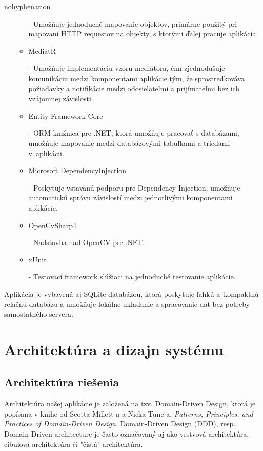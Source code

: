 \begin{hyphenrules}{nohyphenation}
\begin{itemize}
\begin{itemize}
        - Umožňuje jednoduché mapovanie objektov, primárne použitý pri mapovaní HTTP requestov na objekty, s ktorými ďalej pracuje aplikácia.
        \item MediatR \cite{mediatr}

        - Umožňuje implementáciu vzoru mediátora, čím zjednodušuje komunikáciu medzi komponentami aplikácie tým, že sprostredkováva požiadavky a notifikácie medzi odosielateľmi a prijímateľmi bez ich vzájomnej závislosti.

        \item Entity Framework Core \cite{efcore}

        - ORM knižnica pre .NET, ktorá umožňuje pracovať s databázami, umožňuje mapovanie medzi databázovými tabuľkami a triedami v~aplikácii.

        \item Microsoft DependencyInjection \cite{dependency-injection}

        - Poskytuje vstavanú podporu pre Dependency Injection, umožňuje automatickú správu závislostí medzi jednotlivými komponentami aplikácie.

        \item OpenCvSharp4 \cite{opencv}

        - Nadstavba nad OpenCV pre .NET.

        \item xUnit \cite{xunit}

        - Testovací framework slúžiaci na jednoduché testovanie aplikácie.
        
    \end{itemize}
\end{itemize}

Aplikácia je vybavená aj SQLite\cite{sqlite} databázou, ktorá poskytuje ľahkú a~kompaktnú relačnú databázu a umožňuje lokálne ukladanie a spracovanie dát bez potreby samostatného servera.

\section{Architektúra a dizajn systému}
\subsection{Architektúra riešenia}
Architektúra našej aplikácie je založená na tzv. Domain-Driven Design, ktorá je popísana v knihe od Scotta Millett-a a Nicka Tune-a, \textit{Patterns, Principles, and Practices of Domain-Driven Design}\cite{millett2015ddd}. Domain-Driven Design (DDD), resp. Domain-Driven architecture je často označovaný aj ako vrstvová architektúra, cibuľová architektúra či "čistá" architektúra. 
\newline


\end{hyphenrules}
